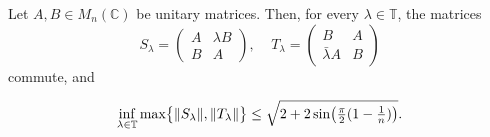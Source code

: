 \begin{theorem}
Let $A, B\in M_n(\mathbb{C})$ be unitary matrices. Then, for every $\lambda\in\mathbb{T}$, the matrices
  \[
    S_\lambda=
      \begin{pmatrix}
        A & \lambda B\\
        B &              A
      \end{pmatrix}
    , \ \ \ \ \
    T_\lambda=\begin{pmatrix}
    B                   &  A\\
    \bar\lambda A &  B
    \end{pmatrix}
  \]
commute, and 
 
  \[
    \inf_{\lambda\in\mathbb{T}}\textup{max}\bigl\{\|S_\lambda\|,\|T_\lambda\|\bigr\}\le\sqrt{2+2\sin\bigl(\tfrac{\pi}{2}(1-\tfrac{1}{n})\bigr)}.
  \]
\end{theorem}

